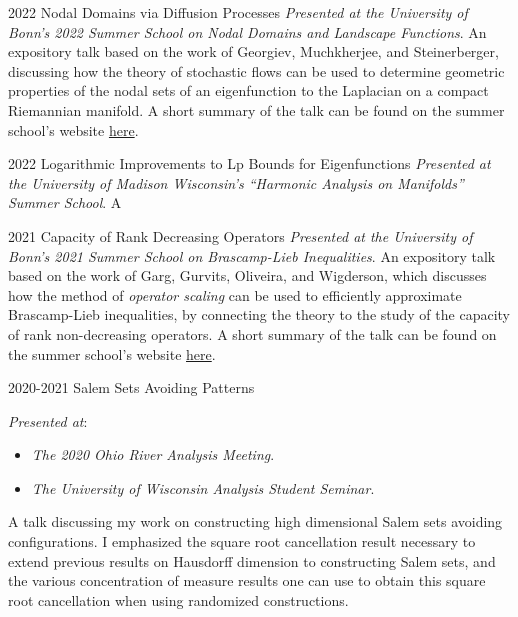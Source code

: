 \documentclass[a4paper]{cv-friggeri}
\begin{document}
\begin{entrylist}

\entry
{2022}
{Nodal Domains via Diffusion Processes}
{}
{\emph{Presented at the University of Bonn's 2022 Summer School on Nodal Domains and Landscape Functions}. An expository talk based on the work of Georgiev, Muchkherjee, and Steinerberger, discussing how the theory of stochastic flows can be used to determine geometric properties of the nodal sets of an eigenfunction to the Laplacian on a compact Riemannian manifold. A short summary of the talk can be found on the summer school's website \href{https://www.math.uni-bonn.de/ag/ana/WiSe2223/summer_school/Kopp2022.pdf}{here}.
}

\entry
{2022}
{Logarithmic Improvements to Lp Bounds for Eigenfunctions}
{}
{\emph{Presented at the University of Madison Wisconsin's ``Harmonic Analysis on Manifolds'' Summer School}. A}

\entry
{2021}
{Capacity of Rank Decreasing Operators}
{}
{\emph{Presented at the University of Bonn's 2021 Summer School on Brascamp-Lieb Inequalities}. An expository talk based on the work of Garg, Gurvits, Oliveira, and Wigderson, which discusses how the method of \emph{operator scaling} can be used to efficiently approximate Brascamp-Lieb inequalities, by connecting the theory to the study of the capacity of rank non-decreasing operators. A short summary of the talk can be found on the summer school's website \href{https://www.math.uni-bonn.de/ag/ana/WiSe2122/BL-school/Kopp2021.pdf}{here}.
}

\entry
{2020-2021}
{Salem Sets Avoiding Patterns}
{}
{\emph{Presented at}:
%
\begin{itemize}
	\item \emph{The 2020 Ohio River Analysis Meeting}.
	\item \emph{The University of Wisconsin Analysis Student Seminar}.
\end{itemize}
%
A talk discussing my work on constructing high dimensional Salem sets avoiding configurations. I emphasized the square root cancellation result necessary to extend previous results on Hausdorff dimension to constructing Salem sets, and the various concentration of measure results one can use to obtain this square root cancellation when using randomized constructions.}


\end{entrylist}
\end{document}
